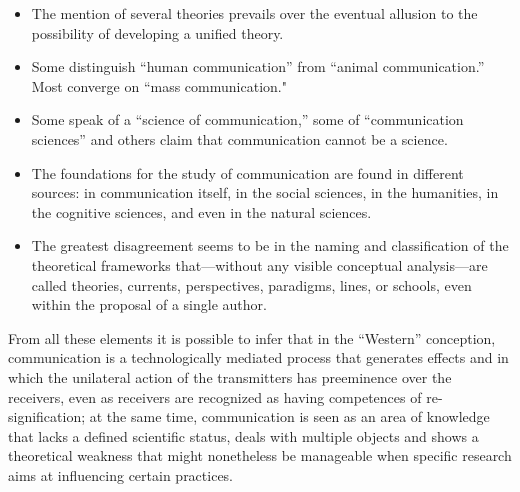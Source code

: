 \documentclass{tufte-handout}
\begin{document}
\begin{itemize}
\item
  The mention of several theories prevails over the eventual allusion to
  the possibility of developing a unified theory.
\item
  Some distinguish ``human communication'' from ``animal
  communication.'' Most converge on ``mass communication."
\item
  Some speak of a ``science of communication,'' some of ``communication
  sciences'' and others claim that communication cannot be a science.
\item
  The foundations for the study of communication are found in different
  sources: in communication itself, in the social sciences, in the
  humanities, in the cognitive sciences, and even in the natural
  sciences.
\item
  The greatest disagreement seems to be in the naming and classification
  of the theoretical frameworks that---without any visible conceptual
  analysis---are called theories, currents, perspectives, paradigms,
  lines, or schools, even within the proposal of a single author.
\end{itemize}

From all these elements it is possible to infer that in the ``Western''
conception, communication is a technologically mediated process that
generates effects and in which the unilateral action of the transmitters
has preeminence over the receivers, even as receivers are recognized as
having competences of re-signification; at the same time, communication
is seen as an area of knowledge that lacks a defined scientific status,
deals with multiple objects and shows a theoretical weakness that might
nonetheless be manageable when specific research aims at influencing
certain practices.
\end{document}
